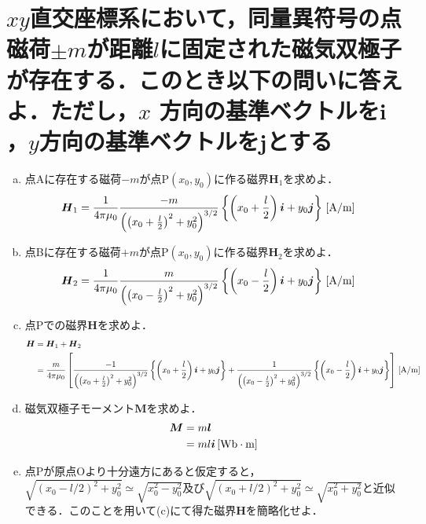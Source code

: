 \documentclass[dvipdfmx]{ujarticle}
\begin{document}
\section{$xy$直交座標系において，同量異符号の点磁荷$\pm m$が距離$l$に固定された磁気双極子が存在する．このとき以下の問いに答えよ．ただし，$x$ 方向の基準ベクトルを$\boldsymbol{i}$，$y$方向の基準ベクトルを$\boldsymbol{j}$とする}
\begin{enumerate}[(a)]
	\item 点Aに存在する磁荷$-m$が点P$(x_0,y_0)$に作る磁界$\boldsymbol{H}_{1}$を求めよ．
	\begin{align*}
		\boldsymbol{H}_{1}&=\frac{1}{4\pi \mu_{0}}\frac{-m}{\left(\left(x_{0}+\frac{l}{2}\right)^{2}+y_{0}^{2}\right)^{3/2}} \left\{ \left(x_{0}+\frac{l}{2}\right)\boldsymbol{i}+y_{0}\boldsymbol{j}\right\}\,[\rm{A/m}]
	\end{align*}
	\item 点Bに存在する磁荷$+m$が点P$(x_0,y_0)$に作る磁界$\boldsymbol{H}_{2}$を求めよ．
	\begin{align*}
		\boldsymbol{H}_{2}&=\frac{1}{4\pi \mu_{0}}\frac{m}{\left(\left(x_{0}-\frac{l}{2}\right)^{2}+y_{0}^{2}\right)^{3/2}} \left\{ \left(x_{0}-\frac{l}{2}\right)\boldsymbol{i}+y_{0}\boldsymbol{j}\right\}\,[\rm{A/m}]
	\end{align*}
	\item 点Pでの磁界$\boldsymbol{H}$を求めよ．
	\begin{align*}
		\boldsymbol{H}&=\boldsymbol{H}_{1}+\boldsymbol{H}_{2}\\
		&=\frac{m}{4\pi \mu_{0}}\left[\frac{-1}{\left(\left(x_{0}+\frac{l}{2}\right)^{2}+y_{0}^{2}\right)^{3/2}} \left\{ \left(x_{0}+\frac{l}{2}\right)\boldsymbol{i}+y_{0}\boldsymbol{j}\right\}+\frac{1}{\left(\left(x_{0}-\frac{l}{2}\right)^{2}+y_{0}^{2}\right)^{3/2}} \left\{ \left(x_{0}-\frac{l}{2}\right)\boldsymbol{i}+y_{0}\boldsymbol{j}\right\}\right]\,[\rm{A/m}]
	\end{align*}
	\item 磁気双極子モーメント$\boldsymbol{M}$を求めよ．
	\begin{align*}
		\boldsymbol{M}&=m\boldsymbol{l}\\
		&=ml\boldsymbol{i}\,[\rm{Wb\cdot m}]
	\end{align*}
	\item 点Pが原点Oより十分遠方にあると仮定すると，$\sqrt{(x_{0}-l/2)^{2}+y_{0}^{2}}\simeq \sqrt{x_{0}^{2}-y_{0}^{2}}$及び$\sqrt{(x_{0}+l/2)^{2}+y_{0}^{2}} \simeq \sqrt{x_{0}^{2}+y_{0}^{2}}$と近似できる．このことを用いて(c)にて得た磁界$\boldsymbol{H}$を簡略化せよ．

\end{enumerate}
\end{document}
